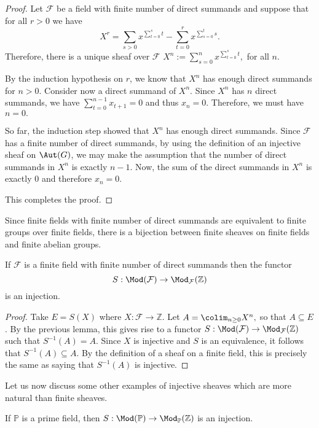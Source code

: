 \documentclass[a4paper,reqno,oneside]{article}
\begin{document}
\begin{proof}
Let $\mathcal{F}$ be a field with finite number of direct summands and suppose that for all $r>0$ we have
$$
X^r=\sum_{s>0}x^{\sum_{t=0}^{s} t}-\sum_{t=0}^{r}x^{\sum_{s=0}^{t} s}.
$$
Therefore, there is a unique sheaf over $\mathcal{F}$ $X^{n}:=\sum_{s=0}^nx^{\sum_{t=0}^{s} t},$ for all $n$. 

By the induction hypothesis on $r$, we know that $X^{n}$ has enough direct summands for $n>0$. Consider now a direct summand of $X^{n}$. Since $X^{n}$ has $n$ direct summands, we have $\sum_{t=0}^{n-1}x_{t+1}=0$ and thus $x_{n}=0.$ Therefore, we must have $n=0.$ 

So far, the induction step showed that $X^{n}$ has enough direct summands. Since $\mathcal{F}$ has a finite number of direct summands, by using the definition of an injective sheaf on $\Aut(G)$, we may make the assumption that the number of direct summands in $X^{n}$ is exactly $n-1.$ Now, the sum of the direct summands in $X^{n}$ is exactly $0$ and therefore $x_{n}=0.$ 

This completes the proof. 
\end{proof}

Since finite fields with finite number of direct summands are equivalent to finite groups over finite fields, there is a bijection between finite sheaves on finite fields and finite abelian groups.

\begin{lemma}\label{lem:injection_functor_on_sheaves}
If $\mathcal{F}$ is a finite field with finite number of direct summands then the functor
\[
S: \Mod(\mathcal{F})\rightarrow \Mod_{\mathcal{F}}(\mathbb{Z})
\]
is an injection. 
\end{lemma}

\begin{proof}
Take $E=S(X)$ where $X:\mathcal{F}\rightarrow \mathbb{Z}$. Let $A=\colim_{n \geq 0}X^{n},$ so that $A\subseteq E$. By the previous lemma, this gives rise to a functor $S: \Mod(\mathcal{F})\rightarrow \Mod_{\mathcal{F}}(\mathbb{Z})$ such that $S^{-1}(A)=A.$ Since $X$ is injective and $S$ is an equivalence, it follows that $S^{-1}(A)\subseteq A.$ By the definition of a sheaf on a finite field, this is precisely the same as saying that $S^{-1}(A)$ is injective. 
\end{proof}

Let us now discuss some other examples of injective sheaves which are more natural than finite sheaves. 

\begin{lemma}\label{lem:injective_sheaf_on_prime_fields}
If $\mathbb{P}$ is a prime field, then $S: \Mod(\mathbb{P})\rightarrow \Mod_{\mathbb{P}}(\mathbb{Z})$ is an injection.
\end{lemma}
\end{document}

